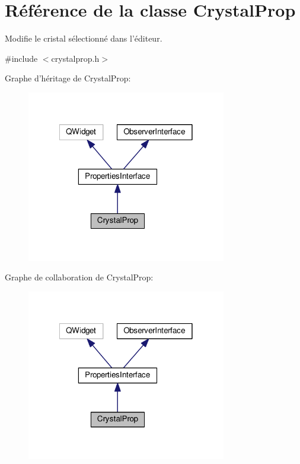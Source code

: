 \hypertarget{classCrystalProp}{\section{Référence de la classe Crystal\+Prop}
\label{classCrystalProp}
}


Modifie le cristal sélectionné dans l’éditeur.  




{\ttfamily \#include $<$crystalprop.\+h$>$}



Graphe d'héritage de Crystal\+Prop\+:\nopagebreak
\begin{figure}[H]
\begin{center}
\leavevmode
\includegraphics[width=247pt]{d8/d57/classCrystalProp__inherit__graph}
\end{center}
\end{figure}


Graphe de collaboration de Crystal\+Prop\+:\nopagebreak
\begin{figure}[H]
\begin{center}
\leavevmode
\includegraphics[width=247pt]{d0/d15/classCrystalProp__coll__graph}
\end{center}
\end{figure}
